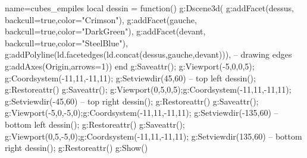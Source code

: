 \begin{luadraw}{name=cubes_empiles}
local dessin = function()
    g:Dscene3d(
        g:addFacet(dessus, {backcull=true,color="Crimson"}), g:addFacet(gauche, {backcull=true,color="DarkGreen"}),
        g:addFacet(devant, {backcull=true,color="SteelBlue"}),
        g:addPolyline(ld.facetedges(ld.concat(dessus,gauche,devant))), -- drawing edges
        g:addAxes(Origin,{arrows=1}))
end
g:Saveattr(); g:Viewport(-5,0,0,5); g:Coordsystem(-11,11,-11,11); g:Setviewdir(45,60) -- top left
 dessin(); g:Restoreattr()
g:Saveattr(); g:Viewport(0,5,0,5);g:Coordsystem(-11,11,-11,11); g:Setviewdir(-45,60) -- top right
dessin(); g:Restoreattr()
g:Saveattr(); g:Viewport(-5,0,-5,0);g:Coordsystem(-11,11,-11,11); g:Setviewdir(-135,60) -- bottom left
dessin(); g:Restoreattr()
g:Saveattr(); g:Viewport(0,5,-5,0);g:Coordsystem(-11,11,-11,11); g:Setviewdir(135,60) -- bottom right
dessin(); g:Restoreattr()
g:Show()
\end{luadraw}
